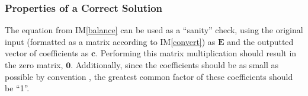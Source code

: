 \documentclass[12pt]{article}
\newcommand{\aref}[1]{A\ref{#1}}
\newcommand{\iref}[1]{IM\ref{#1}}
\begin{document}


\subsubsection{Properties of a Correct Solution} \label{sec_PropsCorrSol}

The equation from \iref{balance} can be used as a ``sanity'' check, using the
original input (formatted as a matrix according to \iref{convert}) as
$\textbf{E}$ and the outputted vector of coefficients as $\textbf{c}$.
Performing this matrix multiplication should result in the zero matrix,
$\textbf{0}$. Additionally, since the coefficients should be as small as
possible by convention \cite{lund_introduction_2023}, the greatest common
factor of these coefficients should be ``1''.


\end{document}
